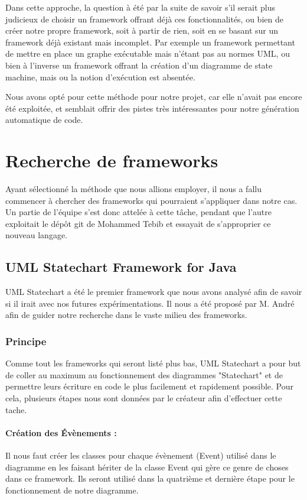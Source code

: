 \documentclass[french, 12pt, a4paper]{article}
\begin{document}
    Dans cette approche, la question à été par la suite de savoir s'il serait plus judicieux de choisir un framework offrant déjà ces fonctionnalités, ou bien de créer notre propre framework, soit à partir de rien, soit en se basant sur un framework déjà existant mais incomplet. Par exemple un framework permettant de mettre en place un graphe exécutable mais n'étant pas au normes UML, ou bien à l'inverse un framework offrant la création d'un diagramme de state machine, mais ou la notion d'exécution est absentée.
    
    Nous avons opté pour cette méthode pour notre projet, car elle n'avait pas encore été exploitée, et semblait offrir des pistes très intéressantes pour notre génération automatique de code.
    


\section{Recherche de frameworks}
Ayant sélectionné la méthode que nous allions employer, il nous a fallu commencer à chercher des frameworks qui pourraient s'appliquer dans notre cas. Un partie de l'équipe s'est donc attelée à cette tâche, pendant que l'autre exploitait le dépôt git de Mohammed Tebib et essayait de s'approprier ce nouveau langage. 

    \subsection{UML Statechart Framework for Java}
    UML Statechart a été le premier framework que nous avons analysé afin de savoir si il irait avec nos futures expérimentations. Il nous a été proposé par M. André afin de guider notre recherche dans le vaste milieu des frameworks.
    
        \subsubsection{Principe}
        Comme tout les frameworks qui seront listé plus bas, UML Statechart a pour but de coller au maximum au fonctionnement des diagrammes "Statechart" et de permettre leurs écriture en code le plus facilement et rapidement possible. Pour cela, plusieurs étapes nous sont données par le créateur afin d'effectuer cette tache.
        
        \paragraph{Création des Évènements :}
        Il nous faut créer les classes pour chaque évènement (Event) utilisé dans le diagramme en les faisant hériter de la classe Event qui gère ce genre de choses dans ce framework. Ils seront utilisé dans la quatrième et dernière étape pour le fonctionnement de notre diagramme.
        
\end{document}
